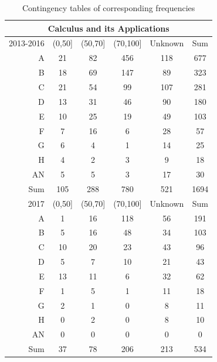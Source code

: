 \documentclass[a4paper]{report}
\begin{document}
\begin{table}[ht]
  \centering
  \begin{tabular}{r|cccc|c}
    \hline
    \multicolumn{6}{c}{\textbf{Calculus and its Applications}} \\
    \hline
  2013-2016 & (0,50] & (50,70] & (70,100] & Unknown & Sum \\ 
  \hline
  A & 21 & 82 & 456 & 118 & 677 \\ 
    B & 18 & 69 & 147 & 89 & 323 \\ 
    C & 21 & 54 & 99 & 107 & 281 \\ 
    D & 13 & 31 & 46 & 90 & 180 \\ 
    E & 10 & 25 & 19 & 49 & 103 \\ 
    F & 7 & 16 & 6 & 28 & 57 \\ 
    G & 6 & 4 & 1 & 14 & 25 \\ 
    H & 4 & 2 & 3 & 9 & 18 \\ 
    AN & 5 & 5 & 3 & 17 & 30 \\ 
    \hline
    Sum & 105 & 288 & 780 & 521 & 1694 \\ 
     \hline
     \hline
    2017 & (0,50] & (50,70] & (70,100] & Unknown & Sum \\ 
     \hline
   A & 1 & 16 & 118 & 56 & 191 \\ 
     B & 5 & 16 & 48 & 34 & 103 \\ 
     C & 10 & 20 & 23 & 43 & 96 \\ 
     D & 5 & 7 & 10 & 21 & 43 \\ 
     E & 13 & 11 & 6 & 32 & 62 \\ 
     F & 1 & 5 & 1 & 11 & 18 \\ 
     G & 2 & 1 & 0 & 8 & 11 \\ 
     H & 0 & 2 & 0 & 8 & 10 \\ 
     AN & 0 & 0 & 0 & 0 & 0 \\ 
    \hline
     Sum & 37 & 78 & 206 & 213 & 534 \\ 
      \hline
  \end{tabular}
  \caption{\label{tab:REL_CAPGrade_vs_MDT}Contingency tables of corresponding frequencies}
\end{table}
\end{document}
